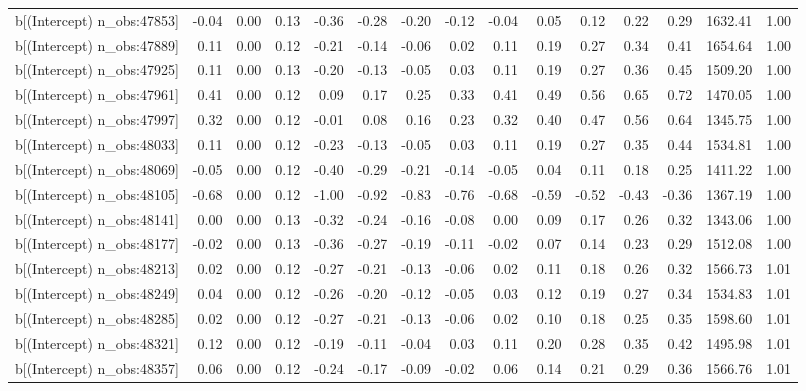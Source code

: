 \begin{table}[ht]
\begin{tabular}{rrrrrrrrrrrrrrr}
  b[(Intercept) n\_obs:47853] & -0.04 & 0.00 & 0.13 & -0.36 & -0.28 & -0.20 & -0.12 & -0.04 & 0.05 & 0.12 & 0.22 & 0.29 & 1632.41 & 1.00 \\ 
  b[(Intercept) n\_obs:47889] & 0.11 & 0.00 & 0.12 & -0.21 & -0.14 & -0.06 & 0.02 & 0.11 & 0.19 & 0.27 & 0.34 & 0.41 & 1654.64 & 1.00 \\ 
  b[(Intercept) n\_obs:47925] & 0.11 & 0.00 & 0.13 & -0.20 & -0.13 & -0.05 & 0.03 & 0.11 & 0.19 & 0.27 & 0.36 & 0.45 & 1509.20 & 1.00 \\ 
  b[(Intercept) n\_obs:47961] & 0.41 & 0.00 & 0.12 & 0.09 & 0.17 & 0.25 & 0.33 & 0.41 & 0.49 & 0.56 & 0.65 & 0.72 & 1470.05 & 1.00 \\ 
  b[(Intercept) n\_obs:47997] & 0.32 & 0.00 & 0.12 & -0.01 & 0.08 & 0.16 & 0.23 & 0.32 & 0.40 & 0.47 & 0.56 & 0.64 & 1345.75 & 1.00 \\ 
  b[(Intercept) n\_obs:48033] & 0.11 & 0.00 & 0.12 & -0.23 & -0.13 & -0.05 & 0.03 & 0.11 & 0.19 & 0.27 & 0.35 & 0.44 & 1534.81 & 1.00 \\ 
  b[(Intercept) n\_obs:48069] & -0.05 & 0.00 & 0.12 & -0.40 & -0.29 & -0.21 & -0.14 & -0.05 & 0.04 & 0.11 & 0.18 & 0.25 & 1411.22 & 1.00 \\ 
  b[(Intercept) n\_obs:48105] & -0.68 & 0.00 & 0.12 & -1.00 & -0.92 & -0.83 & -0.76 & -0.68 & -0.59 & -0.52 & -0.43 & -0.36 & 1367.19 & 1.00 \\ 
  b[(Intercept) n\_obs:48141] & 0.00 & 0.00 & 0.13 & -0.32 & -0.24 & -0.16 & -0.08 & 0.00 & 0.09 & 0.17 & 0.26 & 0.32 & 1343.06 & 1.00 \\ 
  b[(Intercept) n\_obs:48177] & -0.02 & 0.00 & 0.13 & -0.36 & -0.27 & -0.19 & -0.11 & -0.02 & 0.07 & 0.14 & 0.23 & 0.29 & 1512.08 & 1.00 \\ 
  b[(Intercept) n\_obs:48213] & 0.02 & 0.00 & 0.12 & -0.27 & -0.21 & -0.13 & -0.06 & 0.02 & 0.11 & 0.18 & 0.26 & 0.32 & 1566.73 & 1.01 \\ 
  b[(Intercept) n\_obs:48249] & 0.04 & 0.00 & 0.12 & -0.26 & -0.20 & -0.12 & -0.05 & 0.03 & 0.12 & 0.19 & 0.27 & 0.34 & 1534.83 & 1.01 \\ 
  b[(Intercept) n\_obs:48285] & 0.02 & 0.00 & 0.12 & -0.27 & -0.21 & -0.13 & -0.06 & 0.02 & 0.10 & 0.18 & 0.25 & 0.35 & 1598.60 & 1.01 \\ 
  b[(Intercept) n\_obs:48321] & 0.12 & 0.00 & 0.12 & -0.19 & -0.11 & -0.04 & 0.03 & 0.11 & 0.20 & 0.28 & 0.35 & 0.42 & 1495.98 & 1.01 \\ 
  b[(Intercept) n\_obs:48357] & 0.06 & 0.00 & 0.12 & -0.24 & -0.17 & -0.09 & -0.02 & 0.06 & 0.14 & 0.21 & 0.29 & 0.36 & 1566.76 & 1.01 \\ 

\end{tabular}
\end{table}

